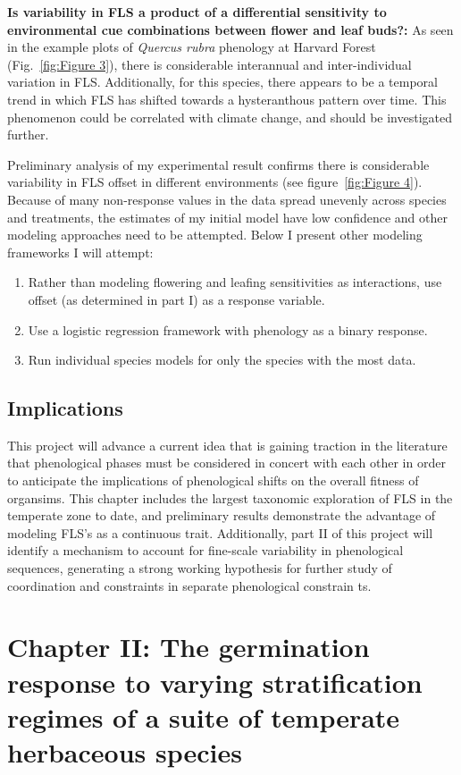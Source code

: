\documentclass[12pt]{article}\usepackage[]{graphicx}\usepackage[]{color}
\begin{document}
\par\textbf{Is variability in FLS a product of a differential sensitivity to environmental cue combinations between flower and leaf buds?:} As seen in the  example plots of \textit{Quercus rubra} phenology at Harvard Forest (Fig.~\ref{fig:Figure 3}), there is considerable interannual and inter-individual variation in FLS. Additionally, for this species, there appears to be a temporal trend in which FLS has shifted towards a hysteranthous pattern over time. This phenomenon could be correlated with climate change, and should be investigated further.
\par Preliminary analysis of my experimental result confirms there is considerable variability in FLS offset in different environments (see figure~\ref{fig:Figure 4}). Because of many non-response values in the data spread unevenly across species and treatments, the estimates of my initial model have low confidence and other modeling approaches need to be attempted. Below I present other modeling frameworks I will attempt:
\begin{enumerate}
\item Rather than modeling flowering and leafing sensitivities as interactions, use offset (as determined in part I) as a response variable.
\item Use a logistic regression framework with phenology as a binary response.
\item Run individual species models for only the species with the most data.
\end{enumerate}
\subsection*{Implications}
\indent\indent This project will advance a current idea that is gaining traction in the literature that phenological phases must be considered in concert with each other in order to anticipate the implications of phenological shifts on the overall fitness of organsims. This chapter includes the largest taxonomic exploration of FLS in the temperate zone to date, and preliminary results demonstrate the advantage of modeling FLS's as a continuous trait. Additionally, part II of this project will identify a mechanism to account for fine-scale variability in phenological sequences, generating a strong working hypothesis for further study of coordination and constraints in separate phenological constrain
ts.
\section*{Chapter II: The germination response to varying stratification regimes of a suite of temperate herbaceous species}
\end{document}
